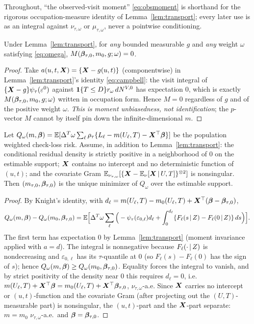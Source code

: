 \noindent Throughout, ``the observed-visit moment'' \eqref{eq:obsmoment} is
shorthand for the rigorous occupation-measure identity of
Lemma~\ref{lem:transport}; every later use is as an integral against
$\nu_{\tau,\omega}$ or $\mu_{\tau,\omega}$, never a pointwise conditioning.

\begin{proposition}\label{prop:id}
Under Lemma~\ref{lem:transport}, for \emph{any} bounded measurable $g$ and
\emph{any} weight $\omega$ satisfying \eqref{eq:omega},
$M(\bm{\beta}_{\tau,0},m_0,g;\omega)=0$.
\end{proposition}
\begin{proof}
Take $a(u,t,\bm{X})=\{\bm{X}-g(u,t)\}$ (componentwise) in
Lemma~\ref{lem:transport}'s identity \eqref{eq:campbell}: the visit integral of
$\{\bm{X}-g\}\psi_\tau(\varepsilon^0)$ against $\mathbf{1}\{T\le D\}r_\omega\,dN^{V,0}$ has
expectation $0$, which is exactly $M(\bm{\beta}_{\tau,0},m_0,g;\omega)$ written in
occupation form. Hence $M=0$ regardless of $g$ and of the positive weight
$\omega$. \emph{This is moment unbiasedness, not identification}; the $p$-vector
$M$ cannot by itself pin down the infinite-dimensional $m$.
\end{proof}

\begin{proposition}\label{prop:identif}
Let $Q_\omega(m,\bm{\beta})=\mathbb{E}[\Delta^T\omega\sum_\ell\rho_\tau\{L_\ell-m(U_\ell,T)
-\bm{X}^\top\bm{\beta}\}]$ be the population weighted check-loss risk. Assume, in
addition to Lemma~\ref{lem:transport}: the conditional residual density is
strictly positive in a neighborhood of $0$ on the estimable support; $\bm{X}$
contains no intercept and no deterministic function of $(u,t)$; and the
covariate Gram $\mathbb{E}_{\nu_{\tau,\omega}}[\{\bm{X}-\mathbb{E}_{\nu}[\bm{X}\,\vert\, U,T]\}^{\otimes2}]$
is nonsingular. Then $(m_{\tau,0},\bm{\beta}_{\tau,0})$ is the unique minimizer of
$Q_\omega$ over the estimable support.
\end{proposition}
\begin{proof}
By Knight's identity, with $d_\ell=m(U_\ell,T)-m_0(U_\ell,T)+\bm{X}^\top
(\bm{\beta}-\bm{\beta}_{\tau,0})$,
\[
Q_\omega(m,\bm{\beta})-Q_\omega(m_0,\bm{\beta}_{\tau,0})
=\mathbb{E}\Big[\Delta^T\omega\sum_\ell\Big(-\psi_\tau(\varepsilon_{0,\ell})d_\ell
   +\int_0^{d_\ell}\{F_\ell(s\,\vert\, Z)-F_\ell(0\,\vert\, Z)\}\,ds\Big)\Big].
\]
The first term has expectation $0$ by Lemma~\ref{lem:transport} (moment
invariance applied with $a=d$). The integral is nonnegative because
$F_\ell(\cdot\,\vert\, Z)$ is nondecreasing and $\varepsilon_{0,\ell}$ has its
$\tau$-quantile at $0$ (so $F_\ell(s)-F_\ell(0)$ has the sign of $s$); hence
$Q_\omega(m,\bm{\beta})\ge Q_\omega(m_0,\bm{\beta}_{\tau,0})$. Equality forces the
integral to vanish, and by strict positivity of the density near $0$ this
requires $d_\ell=0$, i.e.\ $m(U_\ell,T)+\bm{X}^\top\bm{\beta}=m_0(U_\ell,T)
+\bm{X}^\top\bm{\beta}_{\tau,0}$, $\nu_{\tau,\omega}$-a.e. Since $\bm{X}$ carries no intercept
or $(u,t)$-function and the covariate Gram (after projecting out the
$(U,T)$-measurable part) is nonsingular, the $(u,t)$-part and the $\bm{X}$-part
separate: $m=m_0$ $\nu_{\tau,\omega}$-a.e.\ and $\bm{\beta}=\bm{\beta}_{\tau,0}$.
\end{proof}

